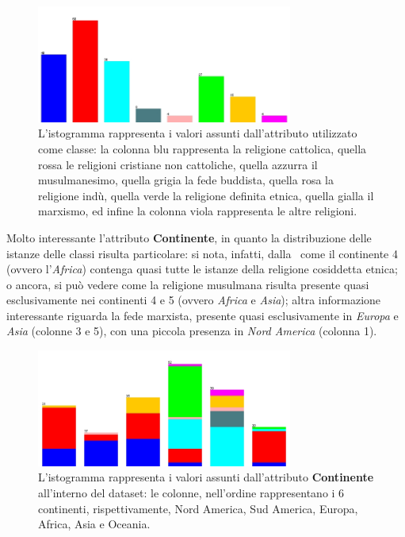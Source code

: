 \documentclass[a4paper,11pt,twoside,notitlepage,final]{scrartcl}
\begin{document}
\begin{figure}[H]
  \centering
  \includegraphics[width=0.75\textwidth]{fig/religion-religion.jpg}%
  \caption{%
    L'istogramma rappresenta i valori assunti dall'attributo utilizzato come classe:
    la colonna blu rappresenta la religione cattolica,
    quella rossa le religioni cristiane non cattoliche, quella azzurra il musulmanesimo,
    quella grigia la fede buddista, quella rosa la religione indù, quella verde la religione
    definita etnica, quella gialla il marxismo, ed infine la colonna viola rappresenta le altre religioni.
  }%
  \label{fig:classes}
\end{figure}

Molto interessante l'attributo \textbf{Continente}, in quanto la distribuzione delle istanze delle classi risulta particolare:
si nota, infatti, dalla~ come il continente 4 (ovvero l'\emph{Africa}) contenga quasi tutte le istanze della religione cosiddetta etnica;
o ancora, si può vedere come la religione musulmana risulta presente quasi esclusivamente nei continenti 4 e 5 (ovvero \emph{Africa} e \emph{Asia});
altra informazione interessante riguarda la fede marxista, presente quasi esclusivamente in \emph{Europa} e \emph{Asia} (colonne 3 e 5), con una piccola presenza in \emph{Nord America} (colonna 1).

\begin{figure}[H]
  \centering
  \includegraphics[width=0.75\textwidth]{fig/religion-landmass.jpg}%
  \caption{%
    L'istogramma rappresenta i valori assunti dall'attributo \textbf{Continente}
    all'interno del dataset: le colonne, nell'ordine rappresentano i 6 continenti, rispettivamente,
    Nord America, Sud America, Europa, Africa, Asia e Oceania.
    }%
  \label{fig:landmass}
\end{figure}
\end{document}
